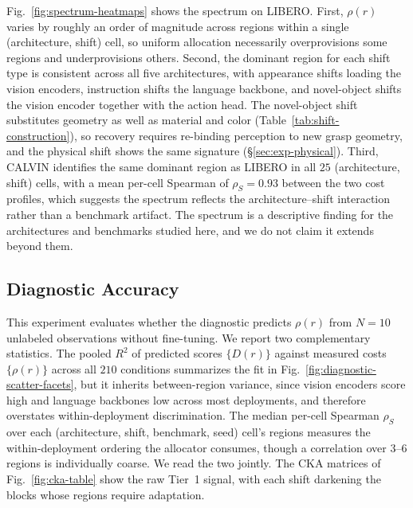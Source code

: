 

Fig.~\ref{fig:spectrum-heatmaps} shows the spectrum on LIBERO.
First, $\rho(r)$ varies by roughly an order of magnitude across regions within a single (architecture, shift) cell, so uniform allocation necessarily overprovisions some regions and underprovisions others.
Second, the dominant region for each shift type is consistent across all five architectures, with appearance shifts loading the vision encoders, instruction shifts the language backbone, and novel-object shifts the vision encoder together with the action head.
The novel-object shift substitutes geometry as well as material and color (Table~\ref{tab:shift-construction}), so recovery requires re-binding perception to new grasp geometry, and the physical shift shows the same signature (\S\ref{sec:exp-physical}).
Third, CALVIN identifies the same dominant region as LIBERO in all $25$ (architecture, shift) cells, with a mean per-cell Spearman of $\rho_S = 0.93$ between the two cost profiles, which suggests the spectrum reflects the architecture--shift interaction rather than a benchmark artifact.
The spectrum is a descriptive finding for the architectures and benchmarks studied here, and we do not claim it extends beyond them.

\subsection{Diagnostic Accuracy}
\label{sec:exp-diagnostic}

This experiment evaluates whether the diagnostic predicts $\rho(r)$ from $N = 10$ unlabeled observations without fine-tuning.
We report two complementary statistics.
The pooled $R^2$ of predicted scores $\{D(r)\}$ against measured costs $\{\rho(r)\}$ across all $210$ conditions summarizes the fit in Fig.~\ref{fig:diagnostic-scatter-facets}, but it inherits between-region variance, since vision encoders score high and language backbones low across most deployments, and therefore overstates within-deployment discrimination.
The median per-cell Spearman $\rho_S$ over each (architecture, shift, benchmark, seed) cell's regions measures the within-deployment ordering the allocator consumes, though a correlation over $3$--$6$ regions is individually coarse.
We read the two jointly.
The CKA matrices of Fig.~\ref{fig:cka-table} show the raw Tier~1 signal, with each shift darkening the blocks whose regions require adaptation.

